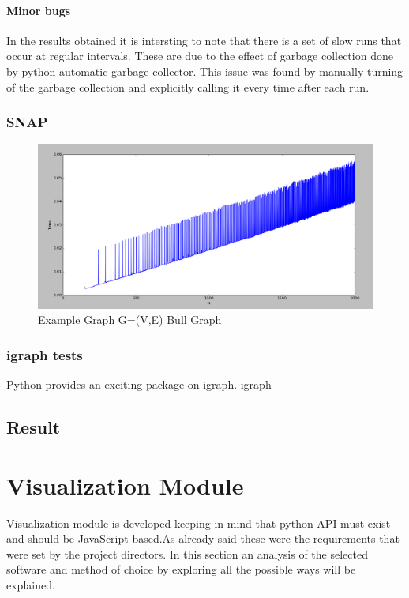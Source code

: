 \subsubsection{Minor bugs}
In the results obtained it is intersting to note that there is a set of slow runs that occur at regular intervals. These are due to the effect of garbage collection done by python automatic garbage collector. This issue was found by manually turning of the garbage collection and explicitly calling it every time after each run. 

\subsection{SNAP}
\cite{snap}
\begin{figure}[H]
\centering
\includegraphics[scale=0.3]{e2000b.png}
\caption{Example Graph G=(V,E) Bull Graph}
\end{figure}

\subsection{igraph tests}
Python provides an exciting package on igraph. igraph 
\cite{igraph}

\section{Result}

\chapter{Visualization Module}
Visualization module is developed keeping in mind that python API must exist and should be JavaScript based.As already said these were the requirements that were set by the project directors. In this section an analysis of the selected software and method of choice by exploring all the possible ways will be explained. 
